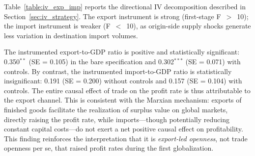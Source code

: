\documentclass[10pt]{article}
\begin{document}
\par Table~\ref{table:iv_exp_imp} reports the directional IV decomposition described in Section~\ref{sec:iv_strategy}. The export instrument is strong (first-stage F~$>$~10); the import instrument is weaker (F~$<$~10), as origin-side supply shocks generate less variation in destination import volumes.

\par The instrumented export-to-GDP ratio is positive and statistically significant: 0.350$^{**}$ (SE = 0.105) in the bare specification and 0.302$^{***}$ (SE = 0.071) with controls. By contrast, the instrumented import-to-GDP ratio is statistically insignificant: 0.191 (SE = 0.200) without controls and 0.157 (SE = 0.104) with controls. The entire causal effect of trade on the profit rate is thus attributable to the export channel. This is consistent with the Marxian mechanism: exports of finished goods facilitate the realization of surplus value on global markets, directly raising the profit rate, while imports---though potentially reducing constant capital costs---do not exert a net positive causal effect on profitability. This finding reinforces the interpretation that it is \emph{export-led openness}, not trade openness per se, that raised profit rates during the first globalization.
\end{document}
